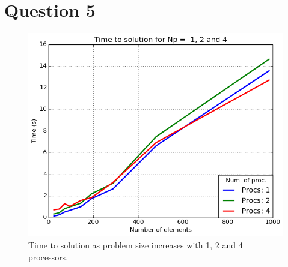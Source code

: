 \documentclass[10pt, a4paper]{article}
\begin{document}
\section*{Question 5}

\begin{figure}[!htb]
  \centering
	  \includegraphics[width=.5\linewidth, clip=true, trim=0cm 0cm 0cm 0cm]{task5_timing}
  \caption{Time to solution as problem size increases with 1, 2 and 4 processors.}
  \label{fig:timing5}
\end{figure}%

%
\end{document}
